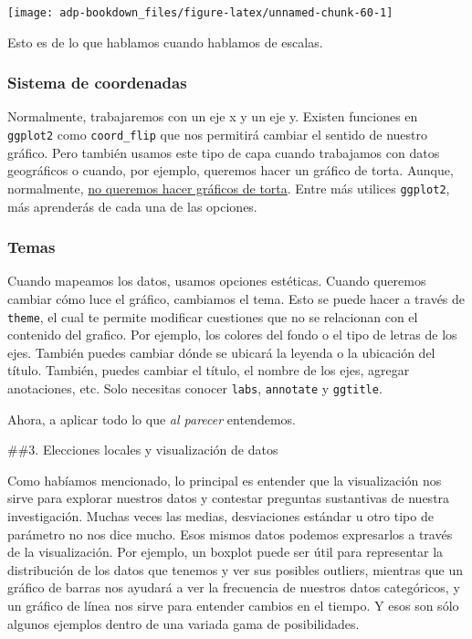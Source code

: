 \documentclass[]{book}
\begin{document}
\begin{center}\texttt{[image: adp-bookdown\_files/figure-latex/unnamed-chunk-60-1]} \end{center}

Esto es de lo que hablamos cuando hablamos de escalas.

\hypertarget{sistema-de-coordenadas}{%
\subsubsection{Sistema de coordenadas}\label{sistema-de-coordenadas}}

Normalmente, trabajaremos con un eje x y un eje y. Existen funciones en
\texttt{ggplot2} como \texttt{coord\_flip} que nos permitirá cambiar el
sentido de nuestro gráfico. Pero también usamos este tipo de capa cuando
trabajamos con datos geográficos o cuando, por ejemplo, queremos hacer
un gráfico de torta. Aunque, normalmente,
\href{https://www.datapine.com/blog/common-data-visualization-mistakes/}{no
queremos hacer gráficos de torta}. Entre más utilices \texttt{ggplot2},
más aprenderás de cada una de las opciones.

\hypertarget{temas}{%
\subsubsection{Temas}\label{temas}}

Cuando mapeamos los datos, usamos opciones estéticas. Cuando queremos
cambiar cómo luce el gráfico, cambiamos el tema. Esto se puede hacer a
través de \texttt{theme}, el cual te permite modificar cuestiones que no
se relacionan con el contenido del grafico. Por ejemplo, los colores del
fondo o el tipo de letras de los ejes. También puedes cambiar dónde se
ubicará la leyenda o la ubicación del título. También, puedes cambiar el
título, el nombre de los ejes, agregar anotaciones, etc. Solo necesitas
conocer \texttt{labs}, \texttt{annotate} y \texttt{ggtitle}.

Ahora, a aplicar todo lo que \emph{al parecer} entendemos.

\#\#3. Elecciones locales y visualización de datos

Como habíamos mencionado, lo principal es entender que la visualización
nos sirve para explorar nuestros datos y contestar preguntas sustantivas
de nuestra investigación. Muchas veces las medias, desviaciones estándar
u otro tipo de parámetro no nos dice mucho. Esos mismos datos podemos
expresarlos a través de la visualización. Por ejemplo, un boxplot puede
ser útil para representar la distribución de los datos que tenemos y ver
sus posibles outliers, mientras que un gráfico de barras nos ayudará a
ver la frecuencia de nuestros datos categóricos, y un gráfico de línea
nos sirve para entender cambios en el tiempo. Y esos son sólo algunos
ejemplos dentro de una variada gama de posibilidades.
\end{document}
